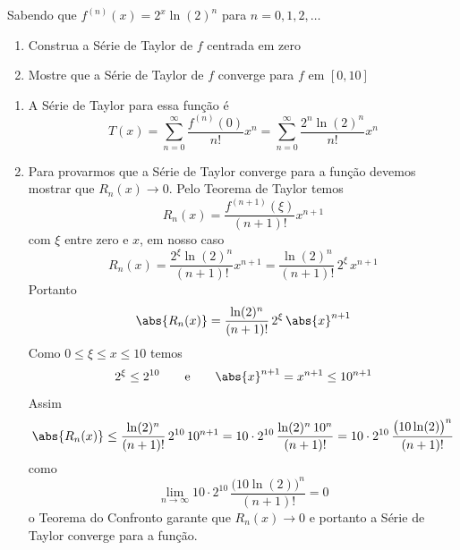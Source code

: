 \documentclass[a4paper,12pt,fleqn]{article}
\begin{document}
\vspace{\baselineskip}
Sabendo que \(f^{(n)}(x) = 2^x\ln(2)^n\) para \(n=0, 1, 2, \dots\)
\begin{enumerate}[label=\alph*)]
  \item Construa a Série de Taylor de $f$ centrada em zero
  \item Mostre que a Série de Taylor de $f$ converge para $f$ em $[0, 10]$
\end{enumerate}

\begin{answer}
\begin{enumerate}[label=\alph*)]
  \item A Série de Taylor para essa função é
  \[
    T(x)
    = \sum_{n=0}^\infty \frac{f^{(n)}(0)}{n!}x^n
    = \sum_{n=0}^\infty \frac{2^n\ln(2)^n}{n!}x^n
  \]
  \item Para provarmos que a Série de Taylor converge para a função devemos
  mostrar que \(R_n(x)\to 0\). Pelo Teorema de Taylor temos
  \[
    R_n(x) = \frac{f^{(n+1)}(\xi)}{(n+1)!}x^{n+1}
  \]
  com $\xi$ entre zero e $x$, em nosso caso
  \[
    R_n(x)
    = \frac{2^\xi\ln(2)^n}{(n+1)!}x^{n+1}
    = \frac{\ln(2)^n}{(n+1)!}\, 2^\xi\, x^{n+1}
  \]
  Portanto
  \[
    \abs{R_n(x)}
    = \frac{\ln(2)^n}{(n+1)!}\, 2^\xi\, \abs{x}^{n+1}
  \]
  Como \(0\leq\xi\leq x\leq 10\) temos
  \[
    2^\xi \leq 2^{10}
    \qquad
    \text{e}
    \qquad
    \abs{x}^{n+1}
    = x^{n+1}
    \leq 10^{n+1}
  \]
  Assim
  \[
    \abs{R_n(x)}
    \leq \frac{\ln(2)^n}{(n+1)!}\, 2^{10}\, 10^{n+1}
    = 10\cdot 2^{10} \,\frac{\ln(2)^n\,10^n}{(n+1)!}
    = 10\cdot 2^{10} \,\frac{\big(10\ln(2)\big)^n}{(n+1)!}
  \]
  como
  \[
    \lim_{n\to\infty} 10\cdot 2^{10} \,\frac{\big(10\ln(2)\big)^n}{(n+1)!} = 0
  \]
  o Teorema do Confronto garante que $R_n(x)\to 0$ e portanto a Série de Taylor
  converge para a função.
\end{enumerate}
\end{answer}

\end{document}
